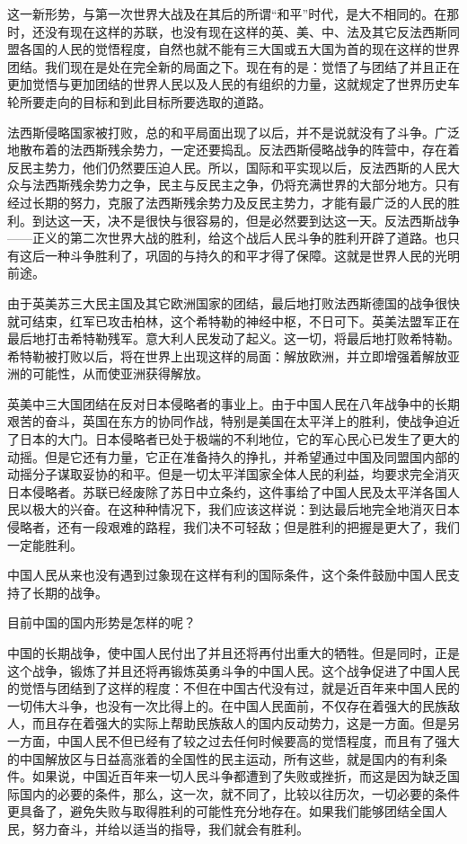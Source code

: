 这一新形势，与第一次世界大战及在其后的所谓“和平”时代，是大不相同的。在那时，还没有现在这样的苏联，也没有现在这样的英、美、中、法及其它反法西斯同盟各国的人民的觉悟程度，自然也就不能有三大国或五大国为首的现在这样的世界团结。我们现在是处在完全新的局面之下。现在有的是：觉悟了与团结了并且正在更加觉悟与更加团结的世界人民以及人民的有组织的力量，这就规定了世界历史车轮所要走向的目标和到此目标所要选取的道路。

法西斯侵略国家被打败，总的和平局面出现了以后，并不是说就没有了斗争。广泛地散布着的法西斯残余势力，一定还要捣乱。反法西斯侵略战争的阵营中，存在着反民主势力，他们仍然要压迫人民。所以，国际和平实现以后，反法西斯的人民大众与法西斯残余势力之争，民主与反民主之争，仍将充满世界的大部分地方。只有经过长期的努力，克服了法西斯残余势力及反民主势力，才能有最广泛的人民的胜利。到达这一天，决不是很快与很容易的，但是必然要到达这一天。反法西斯战争——正义的第二次世界大战的胜利，给这个战后人民斗争的胜利开辟了道路。也只有这后一种斗争胜利了，巩固的与持久的和平才得了保障。这就是世界人民的光明前途。

由于英美苏三大民主国及其它欧洲国家的团结，最后地打败法西斯德国的战争很快就可结束，红军已攻击柏林，这个希特勒的神经中枢，不日可下。英美法盟军正在最后地打击希特勒残军。意大利人民发动了起义。这一切，将最后地打败希特勒。希特勒被打败以后，将在世界上出现这样的局面：解放欧洲，并立即增强着解放亚洲的可能性，从而使亚洲获得解放。

英美中三大国团结在反对日本侵略者的事业上。由于中国人民在八年战争中的长期艰苦的奋斗，英国在东方的协同作战，特别是美国在太平洋上的胜利，使战争迫近了日本的大门。日本侵略者已处于极端的不利地位，它的军心民心已发生了更大的动摇。但是它还有力量，它正在准备持久的挣扎，并希望通过中国及同盟国内部的动摇分子谋取妥协的和平。但是一切太平洋国家全体人民的利益，均要求完全消灭日本侵略者。苏联已经废除了苏日中立条约，这件事给了中国人民及太平洋各国人民以极大的兴奋。在这种种情况下，我们应该这样说：到达最后地完全地消灭日本侵略者，还有一段艰难的路程，我们决不可轻敌；但是胜利的把握是更大了，我们一定能胜利。

中国人民从来也没有遇到过象现在这样有利的国际条件，这个条件鼓励中国人民支持了长期的战争。

目前中国的国内形势是怎样的呢？

中国的长期战争，使中国人民付出了并且还将再付出重大的牺牲。但是同时，正是这个战争，锻炼了并且还将再锻炼英勇斗争的中国人民。这个战争促进了中国人民的觉悟与团结到了这样的程度：不但在中国古代没有过，就是近百年来中国人民的一切伟大斗争，也没有一次比得上的。在中国人民面前，不仅存在着强大的民族敌人，而且存在着强大的实际上帮助民族敌人的国内反动势力，这是一方面。但是另一方面，中国人民不但已经有了较之过去任何时候要高的觉悟程度，而且有了强大的中国解放区与日益高涨着的全国性的民主运动，所有这些，就是国内的有利条件。如果说，中国近百年来一切人民斗争都遭到了失败或挫折，而这是因为缺乏国际国内的必要的条件，那么，这一次，就不同了，比较以往历次，一切必要的条件更具备了，避免失败与取得胜利的可能性充分地存在。如果我们能够团结全国人民，努力奋斗，并给以适当的指导，我们就会有胜利。

